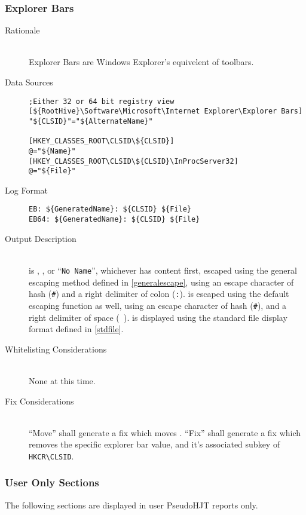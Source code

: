 \subsubsection{Explorer Bars}
\begin{description}
\item[Rationale] \hfill \\
Explorer Bars are Windows Explorer's equivelent of toolbars.
\item[Data Sources] \hfill
\vspace{-\baselineskip}
\begin{verbatim}
;Either 32 or 64 bit registry view
[${RootHive}\Software\Microsoft\Internet Explorer\Explorer Bars]
"${CLSID}"="${AlternateName}"

[HKEY_CLASSES_ROOT\CLSID\${CLSID}]
@="${Name}"
[HKEY_CLASSES_ROOT\CLSID\${CLSID}\InProcServer32]
@="${File}"
\end{verbatim}
\item[Log Format] \hfill
\vspace{-\baselineskip}
\begin{verbatim}
EB: ${GeneratedName}: ${CLSID} ${File}
EB64: ${GeneratedName}: ${CLSID} ${File}
\end{verbatim}
\item[Output Description] \hfill \\
 is , , or ``\verb|No Name|'',
whichever has content first, escaped using the general escaping method defined
in \ref{generalescape}, using an escape character of hash (\verb|#|) and a right
delimiter of colon (\verb|:|).  is escaped using the default escaping
function as well, using an escape character of hash (\verb|#|), and a right
delimiter of space (\verb| |).  is displayed using the standard file
display format defined in \ref{stdfile}.
\item[Whitelisting Considerations] \hfill \\
None at this time.
\item[Fix Considerations] \hfill \\
``Move'' shall generate a fix which moves . ``Fix'' shall generate a
fix which removes the specific explorer bar value, and it's associated subkey of
\verb|HKCR\CLSID|.
\end{description}

\subsubsection{User Only Sections}
The following sections are displayed in user PseudoHJT reports only.

